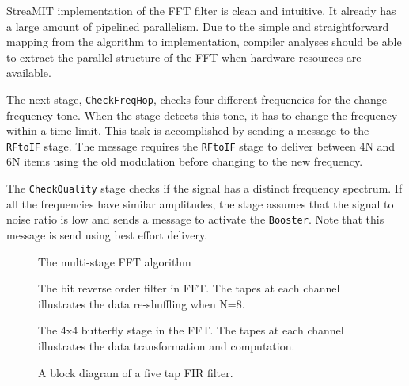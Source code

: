 StreaMIT implementation of the FFT filter is clean and intuitive. It
already has a large amount of pipelined parallelism. Due to the simple
and straightforward mapping from the algorithm to implementation,
compiler analyses should be able to extract the parallel structure of
the FFT when hardware resources are available.

The next stage, {\tt CheckFreqHop}, checks four different frequencies
for the change frequency tone. When the stage detects this tone, it
has to change the frequency within a time limit. This task is
accomplished by sending a message to the {\tt RFtoIF} stage.  The
message requires the {\tt RFtoIF} stage to deliver between 4N and 6N
items using the old modulation before changing to the new frequency.

The {\tt CheckQuality} stage checks if the signal has a distinct
frequency spectrum. If all the frequencies have similar amplitudes,
the stage assumes that the signal to noise ratio is low and sends a
message to activate the {\tt Booster}. Note that this message is send
using best effort delivery.



\begin{figure}
\centering
{}
\caption{The multi-stage FFT algorithm}
\label{fig:fftfilter}
\end{figure}

\begin{figure*}
\centering
{}
\caption{The bit reverse order filter in FFT. The tapes at each
channel illustrates the data re-shuffling when N=8. }
\label{fig:bitreverseorder}
\end{figure*}

\begin{figure*}
\centering
{}
\caption{The 4x4 butterfly stage in the FFT. The tapes at each channel illustrates the data transformation and computation. }
\label{fig:butterfly}
\end{figure*}

\begin{figure}
\centering
{}
\caption{A block diagram of a five tap FIR filter.}
\label{fig:firfilter}
\end{figure}



\newpage

